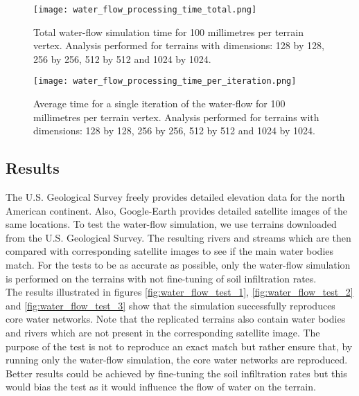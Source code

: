 \begin{figure}
\center
	\texttt{[image: water\_flow\_processing\_time\_total.png]}
	\caption{ Total water-flow simulation time for 100 millimetres per terrain vertex. Analysis performed for terrains with dimensions: 128 by 128, 256 by 256, 512 by 512 and 1024 by 1024.}
	\label{fig:water_flow_processing_time_total}
\end{figure}

\begin{figure}
\center
	\texttt{[image: water\_flow\_processing\_time\_per\_iteration.png]}
	\caption{ Average time for a single iteration of the water-flow for 100 millimetres per terrain vertex. Analysis performed for terrains with dimensions: 128 by 128, 256 by 256, 512 by 512 and 1024 by 1024.}
	\label{fig:water_flow_processing_time_per_iteration}
\end{figure}

\subsection{Results}

The U.S. Geological Survey \protect\footnotemark {}  freely provides detailed elevation data for the north American continent. Also, Google-Earth \protect\footnotemark {} provides detailed satellite images of the same locations. To test the water-flow simulation, we use terrains downloaded from the U.S. Geological Survey. The resulting rivers and streams which are then compared with corresponding satellite images to see if the main water bodies match. For the tests to be as accurate as possible, only the water-flow simulation is performed on the terrains with not fine-tuning of soil infiltration rates. \\
The results illustrated in figures \ref{fig:water_flow_test_1}, \ref{fig:water_flow_test_2} and \ref{fig:water_flow_test_3} show that the simulation successfully reproduces core water networks. Note that the replicated terrains also contain water bodies and rivers which are not present in the corresponding satellite image. The purpose of the test is not to reproduce an exact match but rather ensure that, by running only the water-flow simulation, the core water networks are reproduced. Better results could be achieved by fine-tuning the soil infiltration rates but this would bias the test as it would influence the flow of water on the terrain.

